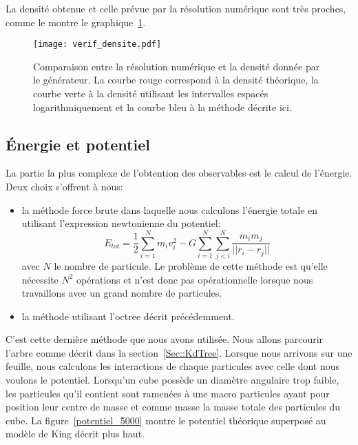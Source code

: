 			La densité obtenue et celle prévue par la résolution numérique sont très proches,
			comme le montre le graphique~\ref{Comp_gene-theo}.
			\begin{figure}[h!]
				\centering \texttt{[image: verif\_densite.pdf]}
				\caption{Comparaison entre la résolution numérique et la densité donnée par le
				générateur\label{Comp_gene-theo}. La courbe rouge correspond à la densité théorique, la
				courbe verte à la densité utilisant les intervalles espacés logarithmiquement et la courbe bleu
				à la méthode décrite ici.}
			\end{figure}

		\subsection{Énergie et potentiel}

			La partie la plus complexe de l'obtention des observables est le calcul de l'énergie. Deux
			choix s'offrent à nous:
			\begin{itemize}
				\item la méthode force brute dans laquelle nous calculons l'énergie totale en utilisant
					l'expression newtonienne du potentiel:
					$$
						E_{tot} = \frac{1}{2}\sum_{i = 1}^{N} m_i v_i^2 - G \sum_{i = 1}^{N} \sum_{j < i}^N \dfrac{m_i m_j}{|| r_i - r_j ||}
					$$
					avec $N$ le nombre de particule. Le problème de cette méthode est qu'elle nécessite $N^2$
					opérations et n'est donc pas opérationnelle lorsque nous travaillons avec un grand
					nombre de particules.

				\item la méthode utilisant l'octree décrit précédemment.
		\end{itemize}
		C'est cette dernière méthode que nous avons utilisée. Nous allons parcourir l'arbre comme décrit dans la
		section~\ref{Sec::KdTree}. Lorsque nous arrivons sur une feuille, nous calculons les interactions de chaque
		particules avec celle dont nous voulons le potentiel. Lorsqu'un cube possède un diamètre angulaire trop
		faible, les particules qu'il contient sont ramenées à une macro particules ayant pour position leur centre
		de masse et comme masse la masse totale des particules du cube. La figure~\ref{potentiel_5000} montre le
		potentiel théorique superposé au modèle de King décrit plus haut.

